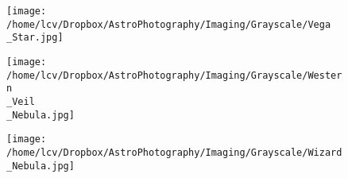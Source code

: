 \newpage
\begin{figure}[phbt]
	\texttt{[image: /home/lcv/Dropbox/AstroPhotography/Imaging/Grayscale/Vega\\\_Star.jpg]}


\end{figure}
\newpage
\begin{figure}[phbt]
	\texttt{[image: /home/lcv/Dropbox/AstroPhotography/Imaging/Grayscale/Western\\\_Veil\\\_Nebula.jpg]}


\end{figure}
\newpage
\begin{figure}[phbt]
	\texttt{[image: /home/lcv/Dropbox/AstroPhotography/Imaging/Grayscale/Wizard\\\_Nebula.jpg]}


\end{figure}
\newpage
